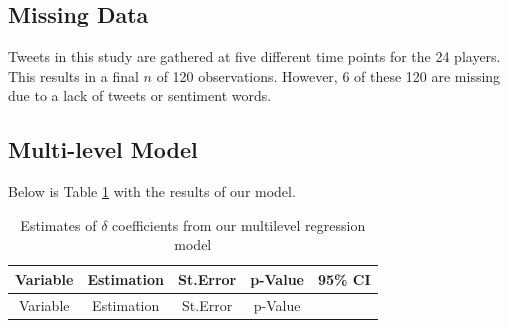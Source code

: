 \documentclass[12pt,twoside]{reedthesis}
\begin{document}
\subsection{Missing Data}\label{missing-data}

Tweets in this study are gathered at five different time points for the
24 players. This results in a final \(n\) of 120 observations. However,
6 of these 120 are missing due to a lack of tweets or sentiment words.

\subsection{Multi-level Model}\label{multi-level-model}

Below is Table \ref{tab:tab1} with the results of our model.
\begin{longtable}[]{@{}ccccc@{}}
\caption{\label{tab:tab1} Estimates of \(\delta\) coefficients from our
multilevel regression model}\tabularnewline
\toprule
\begin{minipage}[b]{0.25\columnwidth}\centering\strut
Variable\strut
\end{minipage} & \begin{minipage}[b]{0.15\columnwidth}\centering\strut
Estimation\strut
\end{minipage} & \begin{minipage}[b]{0.15\columnwidth}\centering\strut
St.Error\strut
\end{minipage} & \begin{minipage}[b]{0.15\columnwidth}\centering\strut
p-Value\strut
\end{minipage} & \begin{minipage}[b]{0.17\columnwidth}\centering\strut
95\% CI\strut
\end{minipage}\tabularnewline
\midrule
\endfirsthead
\toprule
\begin{minipage}[b]{0.25\columnwidth}\centering\strut
Variable\strut
\end{minipage} & \begin{minipage}[b]{0.15\columnwidth}\centering\strut
Estimation\strut
\end{minipage} & \begin{minipage}[b]{0.15\columnwidth}\centering\strut
St.Error\strut
\end{minipage} & \begin{minipage}[b]{0.15\columnwidth}\centering\strut
p-Value\strut
\end{minipage} & \begin{minipage}[b]{0.17\columnwidth}\centering\strut

\end{minipage}
\end{longtable}
\end{document}
